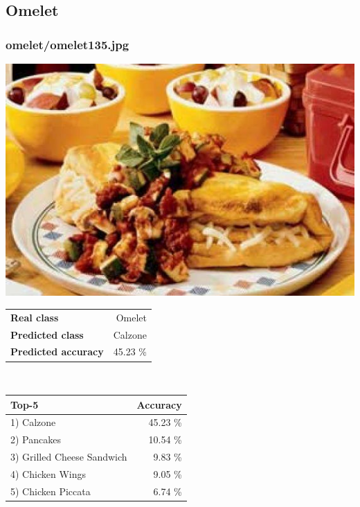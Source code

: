\subsection{Omelet}
    
\subsubsection{omelet/omelet135.jpg}

\begin{minipage}[t]{0.4\textwidth}
	\vspace{0pt}
	\includegraphics[width=\linewidth]{images/evaluation-images/omelet/omelet135.jpg}
\end{minipage}
\hfill
\begin{minipage}[t]{0.5\textwidth}
	\vspace{0pt}\raggedright
	\begin{tabularx}{\textwidth}{X r}
		\small \textbf{Real class} & \small Omelet\\
		\small \textbf{Predicted class} & \small Calzone\\
		\small \textbf{Predicted accuracy} & \small 45.23 \%
    \end{tabularx}\\
    
    \vspace{6pt}
	\begin{tabularx}{\textwidth}{X r}
        \small \textbf{Top-5} & \small \textbf{Accuracy} \\
        \hline
		\small 1) Calzone & \small 45.23 \%\\\small 2) Pancakes & \small 10.54 \%\\\small 3) Grilled Cheese Sandwich & \small 9.83 \%\\\small 4) Chicken Wings & \small 9.05 \%\\\small 5) Chicken Piccata & \small 6.74 \%
    \end{tabularx}
\end{minipage}
    
